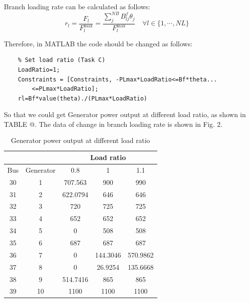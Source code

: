 \documentclass[lettersize,journal]{IEEEtran}
\makeatletter
\newcommand{\Rmnum}[1]{\expandafter\@slowromancap\romannumeral #1@}
\makeatother
\begin{document}
Branch loading rate can be calculated as follows:
\begin{equation}
	r_l=\frac{F_l}{F_l^{\max}}=\frac{\sum_j^{NB}B_{lj}^f\theta_j}{F_l^{\max}}\quad\forall l\in\{1,\cdots,NL\}
\end{equation}


Therefore, in MATLAB the code should be changed as follows:
\begin{lstlisting}
	% Set load ratio (Task C)
	LoadRatio=1;
	Constraints = [Constraints, -PLmax*LoadRatio<=Bf*theta...
		<=PLmax*LoadRatio];
	rl=Bf*value(theta)./(PLmax*LoadRatio)
\end{lstlisting}

So that we could get Generator power output at different load ratio, as shown in TABLE \Rmnum{3}. The data of change in branch loading rate is shown in Fig. 2.

\begin{table}[htbp]
	\centering
	\caption{Generator power output at different load ratio}
	\begin{tabular}{ccccc}
		\toprule
		&       & \multicolumn{3}{c}{Load ratio} \\
		\midrule
		Bus   & Generator & 0.8   & 1     & 1.1 \\
		\midrule
		30    & 1     & 707.563 & 900   & 990 \\
		\midrule
		31    & 2     & 622.0794 & 646   & 646 \\
		\midrule
		32    & 3     & 720   & 725   & 725 \\
		\midrule
		33    & 4     & 652   & 652   & 652 \\
		\midrule
		34    & 5     & 0     & 508   & 508 \\
		\midrule
		35    & 6     & 687   & 687   & 687 \\
		\midrule
		36    & 7     & 0     & 144.3046 & 570.9862 \\
		\midrule
		37    & 8     & 0     & 26.9254 & 135.6668 \\
		\midrule
		38    & 9     & 514.7416 & 865   & 865 \\
		\midrule
		39    & 10    & 1100  & 1100  & 1100 \\
		\bottomrule
	\end{tabular}%
	\label{tab:addlabel}%
\end{table}%
\end{document}
